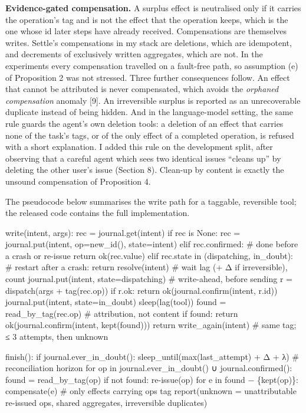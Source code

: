 \documentclass[
  10pt,
]{article}
\newenvironment{Shaded}{}{}
\newcommand{\NormalTok}[1]{#1}
\begin{document}
\textbf{Evidence-gated compensation.} A surplus effect is neutralised
only if it carries the operation's tag and is not the effect that the
operation keeps, which is the one whose id later steps have already
received. Compensations are themselves writes. Settle's compensations in
my stack are deletions, which are idempotent, and decrements of
exclusively written aggregates, which are not. In the experiments every
compensation travelled on a fault-free path, so assumption (e) of
Proposition 2 was not stressed. Three further consequences follow. An
effect that cannot be attributed is never compensated, which avoids the
\emph{orphaned compensation} anomaly {[}9{]}. An irreversible surplus is
reported as an unrecoverable duplicate instead of being hidden. And in
the language-model setting, the same rule guards the agent's own
deletion tools: a deletion of an effect that carries none of the task's
tags, or of the only effect of a completed operation, is refused with a
short explanation. I added this rule on the development split, after
observing that a careful agent which sees two identical issues ``cleans
up'' by deleting the other user's issue (Section 8). Clean-up by content
is exactly the unsound compensation of Proposition 4.

The pseudocode below summarises the write path for a taggable,
reversible tool; the released code contains the full implementation.

\begin{Shaded}
\begin{Highlighting}[]
\NormalTok{write(intent, args):}
\NormalTok{  rec = journal.get(intent)}
\NormalTok{  if rec is None:}
\NormalTok{    rec = journal.put(intent, op=new\_id(), state=intent)}
\NormalTok{  elif rec.confirmed:                     \# done before a crash or re{-}issue}
\NormalTok{    return ok(rec.value)}
\NormalTok{  elif rec.state in (dispatching, in\_doubt):    \# restart after a crash:}
\NormalTok{    return resolve(intent)       \# wait lag (+ Δ if irreversible), count}
\NormalTok{  journal.put(intent, state=dispatching)  \# write{-}ahead, before sending}
\NormalTok{  r = dispatch(args + tag(rec.op))}
\NormalTok{  if r.ok: return ok(journal.confirm(intent, r.id))}
\NormalTok{  journal.put(intent, state=in\_doubt)}
\NormalTok{  sleep(lag(tool))}
\NormalTok{  found = read\_by\_tag(rec.op)             \# attribution, not content}
\NormalTok{  if found: return ok(journal.confirm(intent, kept(found)))}
\NormalTok{  return write\_again(intent)        \# same tag; ≤ 3 attempts, then unknown}

\NormalTok{finish():}
\NormalTok{  if journal.ever\_in\_doubt():}
\NormalTok{    sleep\_until(max(last\_attempt) + Δ + λ)    \# reconciliation horizon}
\NormalTok{  for op in journal.ever\_in\_doubt() ∪ journal.confirmed():}
\NormalTok{    found = read\_by\_tag(op)}
\NormalTok{    if not found: re{-}issue(op)}
\NormalTok{    for e in found − \{kept(op)\}:}
\NormalTok{      compensate(e)                   \# only effects carrying op\textquotesingle{}s tag}
\NormalTok{  report(unknown = unattributable re{-}issued ops, shared aggregates,}
\NormalTok{         irreversible duplicates)}
\end{Highlighting}
\end{Shaded}
\end{document}
